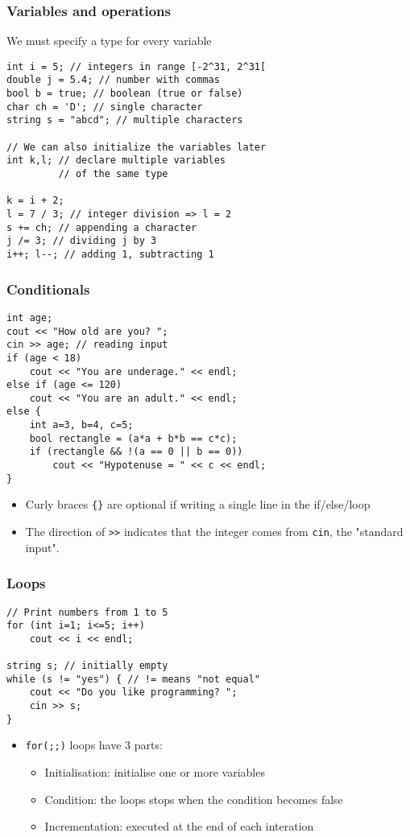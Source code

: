 \documentclass[12pt]{beamer}
\begin{document}
\begin{frame}[fragile]
\frametitle{Variables and operations}
We must specify a type for every variable
\begin{lstlisting}
int i = 5; // integers in range [-2^31, 2^31[
double j = 5.4; // number with commas
bool b = true; // boolean (true or false)
char ch = 'D'; // single character
string s = "abcd"; // multiple characters

// We can also initialize the variables later
int k,l; // declare multiple variables
         // of the same type

k = i + 2;
l = 7 / 3; // integer division => l = 2
s += ch; // appending a character
j /= 3; // dividing j by 3
i++; l--; // adding 1, subtracting 1
\end{lstlisting}
\end{frame}

\begin{frame}[fragile]
\frametitle{Conditionals}
\begin{lstlisting}
int age;
cout << "How old are you? ";
cin >> age; // reading input
if (age < 18)
    cout << "You are underage." << endl;
else if (age <= 120)
    cout << "You are an adult." << endl;
else {
    int a=3, b=4, c=5;
    bool rectangle = (a*a + b*b == c*c);
    if (rectangle && !(a == 0 || b == 0))
        cout << "Hypotenuse = " << c << endl;
}
\end{lstlisting}
\begin{itemize}
\item Curly braces \lstinline|{}| are optional if writing a single line in the if/else/loop
\item The direction of \lstinline|>>| indicates that the integer comes from \lstinline|cin|, the "standard input".
\end{itemize}
\end{frame}

\begin{frame}[fragile]
\frametitle{Loops}
\begin{lstlisting}
// Print numbers from 1 to 5
for (int i=1; i<=5; i++)
    cout << i << endl;

string s; // initially empty
while (s != "yes") { // != means "not equal"
    cout << "Do you like programming? ";
    cin >> s;
}
\end{lstlisting}
\begin{itemize}
\item \lstinline|for(;;)| loops have 3 parts:
\begin{itemize}
\item Initialisation: initialise one or more variables
\item Condition: the loops stops when the condition becomes false
\item Incrementation: executed at the end of each interation
\end{itemize}
\end{itemize}
\end{frame}
\end{document}
